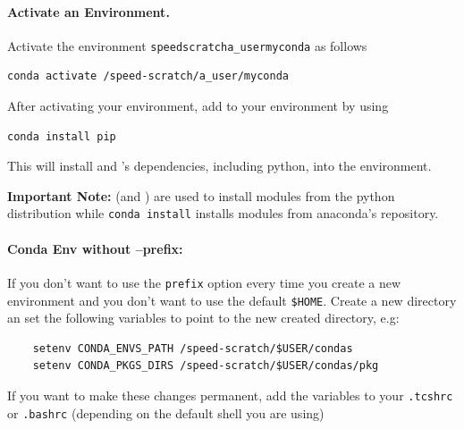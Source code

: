 \paragraph{Activate an Environment.}

Activate the environment \texttt{\/speed\-scratch\/a\_user\/myconda} as follows
\begin{verbatim}
conda activate /speed-scratch/a_user/myconda
\end{verbatim}
After activating your environment, add  to your environment by using 
\begin{verbatim}
conda install pip
\end{verbatim}
This will install  and 's dependencies, including python, 
into the environment.


\noindent
\textbf{Important Note:}  (and ) are used to install modules
from the python distribution while \texttt{conda install} installs modules from 
anaconda's repository.

\paragraph{Conda Env without --prefix: }

If you don't want to use the \texttt{\-\-prefix} option every time you create a new environment and you don't want to use the default \texttt{\-\$HOME}.
Create a new directory an set the following variables to point to the new created directory, e.g:
\begin{verbatim}
	setenv CONDA_ENVS_PATH /speed-scratch/$USER/condas
	setenv CONDA_PKGS_DIRS /speed-scratch/$USER/condas/pkg
\end{verbatim}
If you want to make these changes permanent, add the variables to your \texttt{.tcshrc} or \texttt{.bashrc} (depending on the default shell you are using)


